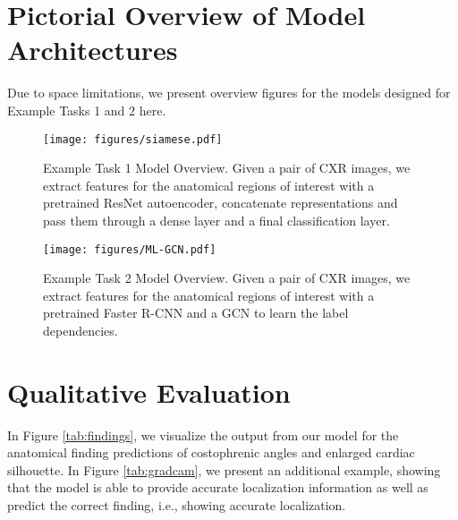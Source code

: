 \newpage
\section{Pictorial Overview of Model Architectures}
Due to space limitations, we present overview figures for the models designed for Example Tasks 1 and 2 here.
\label{clinical_applications}

\begin{figure}[h]
\center
\texttt{[image: figures/siamese.pdf]}
\caption{Example Task 1 Model Overview. Given a pair of CXR images, we extract features for the anatomical regions of interest with a pretrained ResNet autoencoder, concatenate representations and pass them through a dense layer and a final classification layer.}
\vspace{-0.3cm}
\label{fig:siamese}
\end{figure} 

\begin{figure}[h]
\centering
\texttt{[image: figures/ML-GCN.pdf]}
\caption{Example Task 2 Model Overview. Given a pair of CXR images, we extract features for the anatomical regions of interest with a pretrained Faster R-CNN and a GCN to learn the label dependencies.}
\label{fig:gcn}
\vspace{-0.1cm}
\end{figure}

\newpage
\section{Qualitative Evaluation}
In Figure \ref{tab:findings}, we visualize the output from our model for the anatomical finding predictions of costophrenic angles and enlarged cardiac silhouette.
In Figure \ref{tab:gradcam}, we present an additional example, showing that the model is able to provide accurate localization information as well as predict the correct finding, i.e., showing accurate localization.


